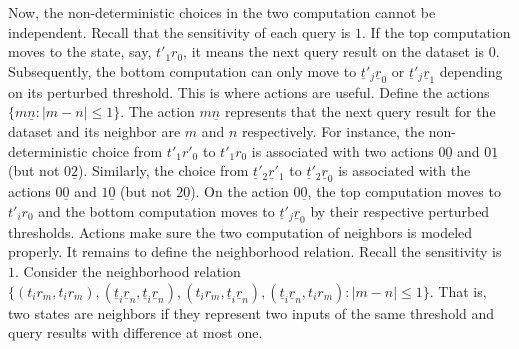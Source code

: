 Now, the non-deterministic choices in the two computation cannot be 
independent. Recall that the sensitivity of each query is
$1$. If the top computation moves to the state, say, $t'_1r_0$, it
means the next query result on the dataset is $0$. Subsequently, the
bottom computation can only move to $\underline{t}'_j\underline{r}_0$
or $\underline{t}'_j\underline{r}_1$ depending on its perturbed
threshold. This is where actions are useful. Define the actions
$\{ m\underline{n} : |m - n| \leq 1 \}$. The action
$m\underline{n}$ represents that the next query result for the dataset
and its neighbor are $m$ and $n$ respectively. For instance, the
non-deterministic choice from $t'_1r'_0$ to $t'_1r_0$ is associated
with two actions $0\underline{0}$ and $0\underline{1}$ (but not
$0\underline{2}$). Similarly, the choice from
$\underline{t}'_2\underline{r}'_1$ to
$\underline{t}'_2\underline{r}_0$ is associated with the actions
$0\underline{0}$ and $1\underline{0}$ (but not $2\underline{0}$). On
the action $0\underline{0}$, the top computation moves to $t'_ir_0$ and
the bottom computation moves to $\underline{t}'_j\underline{r}_0$ by
their respective perturbed thresholds.
Actions make sure the two computation of neighbors
is modeled properly. It remains to define the neighborhood
relation. Recall the sensitivity is $1$. Consider the neighborhood
relation 
$\{ (t_ir_m, t_ir_m),
    (\underline{t}_i\underline{r}_n, \underline{t}_i\underline{r}_n),
    (t_ir_m, \underline{t}_i\underline{r}_n), 
    (\underline{t}_i\underline{r}_n, t_ir_m) : | m - n | \leq 1 \}$.
That is, two states are neighbors if they represent two inputs of the
same threshold and query results with difference at most one.